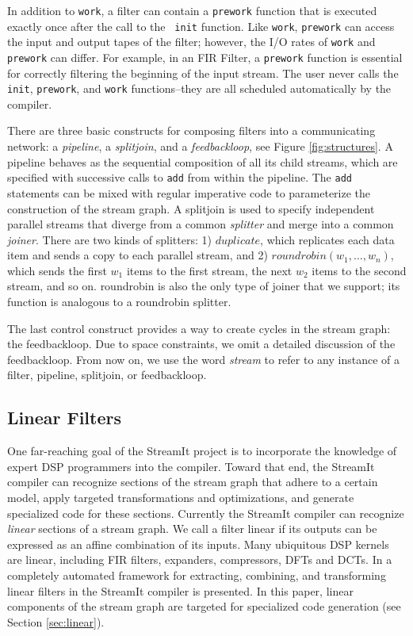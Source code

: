 In addition to {\tt work}, a filter can contain a {\tt prework}
function that is executed exactly once after the call to the {\tt
init} function.  Like {\tt work}, {\tt prework} can access the input and
output tapes of the filter; however, the I/O rates of {\tt work} and
{\tt prework} can differ.  For example, in an FIR Filter, a {\tt prework}
function is essential for correctly filtering the beginning of the
input stream.  The user never calls the {\tt init}, {\tt prework}, and
{\tt work} functions--they are all scheduled automatically by the compiler.

There are three basic constructs for composing filters into a
communicating network: a {\it pipeline}, a {\it splitjoin}, and a {\it
feedbackloop}, see Figure \ref{fig:structures}.  A pipeline behaves as
the sequential composition of all its child streams, which are
specified with successive calls to {\tt add} from within the pipeline.
The {\tt add} statements can be mixed with regular imperative code to
parameterize the construction of the stream graph. A splitjoin is used
to specify independent parallel streams that diverge from a common
{\it splitter} and merge into a common {\it joiner}.  There are two
kinds of splitters: 1) $duplicate$, which replicates each data item
and sends a copy to each parallel stream, and 2) $roundrobin(w_1,
\dots, w_n)$, which sends the first $w_1$ items to the first stream,
the next $w_2$ items to the second stream, and so on. roundrobin is
also the only type of joiner that we support; its function is
analogous to a roundrobin splitter.

The last control construct provides a way to create cycles in the
stream graph: the feedbackloop.  Due to space constraints, we omit a
detailed discussion of the feedbackloop. From now on, we use the word
{\it stream} to refer to any instance of a filter, pipeline,
splitjoin, or feedbackloop.

\subsection{Linear Filters}
One far-reaching goal of the StreamIt project is to incorporate the
knowledge of expert DSP programmers into the compiler.  Toward that
end, the StreamIt compiler can recognize sections of the stream graph
that adhere to a certain model, apply targeted transformations and
optimizations, and generate specialized code for these sections.
Currently the StreamIt compiler can recognize {\it linear} sections of
a stream graph. We call a filter linear if its outputs can be
expressed as an affine combination of its inputs.  Many ubiquitous DSP
kernels are linear, including FIR filters, expanders, compressors,
DFTs and DCTs.  In \cite{streamit-linear} a completely automated
framework for extracting, combining, and transforming linear filters
in the StreamIt compiler is presented.  In this paper, linear
components of the stream graph are targeted for specialized code
generation (see Section \ref{sec:linear}).

